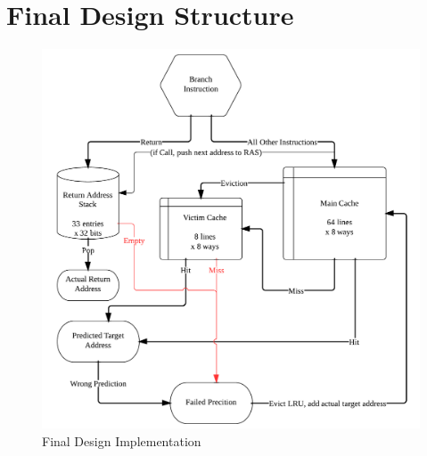 \documentclass[twocolumn]{article}
\newcommand{\centerimage}[3]{
\begin{figure}[ht!]  
\begin{center} #1
\caption{#2}
\label{#3}
\end{center}
\end{figure}}
\begin{document}
\section{Final Design Structure}
\centerimage{\includegraphics[width=\columnwidth]{img/fulldesign.png}}{Final Design Implementation}{fulldesign}
\newpage
\end{document}
